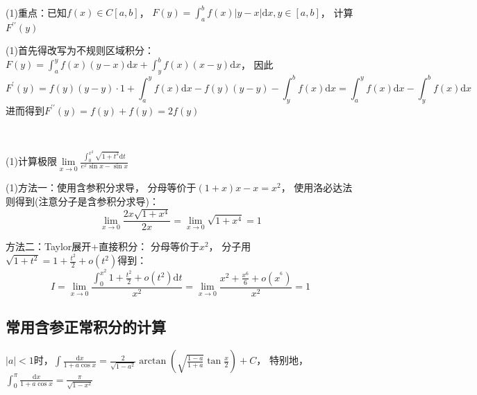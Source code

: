 ~

\begin{exercise}[含参积分求导]
  (1)重点：已知$f(x) \in C[a,b]$，
  $F(y) = \int_a^b f(x)|y - x| \mathrm{d} x, y \in [a,b]$，
  计算$F^{\prime\prime}(y)$
\end{exercise}

\begin{solution}
  (1)首先得改写为不规则区域积分：$F(y) = \int_a^y f(x)(y - x)\mathrm{d} x + \int_y^b f(x)(x - y)\mathrm{d} x$，
  因此
  \begin{equation*}
    F^{\prime}(y) = f(y)(y-y)\cdot 1 + \int_a^y f(x)\mathrm{d} x - f(y)(y-y) - \int_y^b f(x)\mathrm{d} x = \int_a^y f(x)\mathrm{d} x - \int_y^b f(x)\mathrm{d} x
  \end{equation*}
  进而得到$F^{\prime\prime}(y) = f(y) + f(y) = 2f(y)$
\end{solution}

~


\begin{exercise}[含参积分求导的应用]
  (1)计算极限$\lim \limits _{x \rightarrow 0} \frac{\int_0^{x^2} \sqrt{1 + t^2}\mathrm{d} t}{e^x \sin x - \sin x}$
\end{exercise}

\begin{solution}
  (1)方法一：使用含参积分求导，
  分母等价于$(1+x)x - x = x^2$，
  使用洛必达法则得到(注意分子是含参积分求导)：
  \begin{equation*}
    \lim \limits _{x \rightarrow 0}\frac{2x \sqrt{1 + x^4}}{2x} = \lim \limits _{x \rightarrow 0} \sqrt{1 + x^4} = 1
  \end{equation*}

  方法二：Taylor展开+直接积分：
  分母等价于$x^2$，
  分子用$\sqrt{1 + t^2} = 1 + \frac{t^2}{2} + o(t^2)$得到：
  \begin{equation*}
    I = \lim \limits _{x \rightarrow 0} \frac{\int_0^{x^2} 1 + \frac{t^2}{2} + o(t^2) \mathrm{d} t}{x^2} = \lim \limits _{x \rightarrow 0} \frac{x^2 + \frac{x^6}{6} + o(x^{^6})}{x^2} = 1
  \end{equation*}
\end{solution}

\subsection{常用含参正常积分的计算}

\begin{lemma}
  $|a| < 1$时，$\int \frac{\mathrm{d} x }{1 + a \cos x} = \frac{2}{\sqrt{1 - a^2}} \arctan \left( \sqrt{\frac{1-a}{1+a}} \tan \frac{x}{2} \right) + C$，
  特别地，$\int_0^{\pi} \frac{\mathrm{d} x}{1 + a \cos x} = \frac{\pi}{\sqrt{1 - x^2}}$
\end{lemma}

